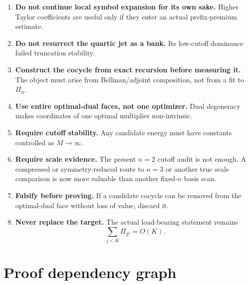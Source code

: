 \documentclass[11pt,a4paper]{article}
\begin{document}
\begin{enumerate}[label=\textbf{R\arabic*.},leftmargin=2.4em]
\item
\textbf{Do not continue local symbol expansion for its own sake.}
Higher Taylor coefficients are useful only if they enter an actual
prefix-premium estimate.

\item
\textbf{Do not resurrect the quartic jet as a bank.}
Its low-cutoff dominance failed truncation stability.

\item
\textbf{Construct the cocycle from exact recursion before measuring it.}
The object must arise from Bellman/adjoint composition, not from a fit to
\(\Pi_n\).

\item
\textbf{Use entire optimal-dual faces, not one optimizer.}
Dual degeneracy makes coordinates of one optimal multiplier non-intrinsic.

\item
\textbf{Require cutoff stability.}
Any candidate energy must have constants controlled as \(M\to\infty\).

\item
\textbf{Require scale evidence.}
The present \(n=2\) cutoff audit is not enough.
A compressed or symmetry-reduced route to \(n=3\) or another true scale
comparison is now more valuable than another fixed-\(n\) basis scan.

\item
\textbf{Falsify before proving.}
If a candidate cocycle can be removed from the optimal-dual face without
loss of value, discard it.

\item
\textbf{Never replace the target.}
The actual load-bearing statement remains
\[
\sum_{j<K}\Pi_{2^j}=O(K).
\]
\end{enumerate}

\section{Proof dependency graph}
\end{document}
